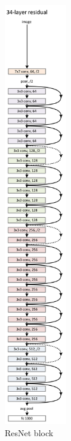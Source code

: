 \begin{figure}[htbp]
\centering
\includegraphics[height=18.5cm]{includes/ResNet}
\caption[ResNet block]{ResNet block \citep[p. 4]{HE2015}}
\label{fig:FH-Logo6}
\end{figure}
\newpage




